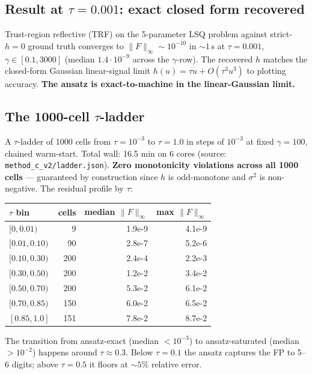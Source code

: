 \documentclass[11pt]{article}
\begin{document}
\subsection{Result at $\tau = 0.001$: exact closed form recovered}

Trust-region reflective (TRF) on the 5-parameter LSQ problem against
strict-$h{=}0$ ground truth converges to $\|F\|_\infty \sim 10^{-10}$
in $\sim 1\,\mathrm{s}$ at $\tau{=}0.001$, $\gamma \in [0.1, 3000]$
(median $1.4 \cdot 10^{-9}$ across the $\gamma$-row). The recovered
$h$ matches the closed-form Gaussian linear-signal limit
$h(u) = \tau u + O(\tau^3 u^3)$ to plotting accuracy. \textbf{The ansatz
is exact-to-machine in the linear-Gaussian limit.}

\subsection{The 1000-cell $\tau$-ladder}

A $\tau$-ladder of 1000 cells from $\tau = 10^{-3}$ to $\tau = 1.0$ in
steps of $10^{-3}$ at fixed $\gamma = 100$, chained warm-start. Total
wall: 16.5 min on 6 cores (source: \texttt{method\_c\_v2/ladder.json}).
\textbf{Zero monotonicity violations across all 1000 cells} ---
guaranteed by construction since $h$ is odd-monotone and $\sigma^2$ is
non-negative. The residual profile by $\tau$:

\begin{center}\small\begin{tabular}{lrrr}\toprule
$\tau$ bin & cells & median $\|F\|_\infty$ & max $\|F\|_\infty$ \\
\midrule
$[0, 0.01)$       & 9   & 1.9e-9  & 4.1e-9  \\
$[0.01, 0.10)$    & 90  & 2.8e-7  & 5.2e-6  \\
$[0.10, 0.30)$    & 200 & 2.4e-4  & 2.2e-3  \\
$[0.30, 0.50)$    & 200 & 1.2e-2  & 3.4e-2  \\
$[0.50, 0.70)$    & 200 & 5.3e-2  & 6.1e-2  \\
$[0.70, 0.85)$    & 150 & 6.0e-2  & 6.5e-2  \\
$[0.85, 1.0]$     & 151 & 7.8e-2  & 8.7e-2  \\
\bottomrule\end{tabular}\end{center}

The transition from ansatz-exact (median $< 10^{-3}$) to
ansatz-saturated (median $> 10^{-2}$) happens around $\tau \approx 0.3$.
Below $\tau = 0.1$ the ansatz captures the FP to 5--6 digits;
above $\tau = 0.5$ it floors at $\sim 5\%$ relative error.
\end{document}
